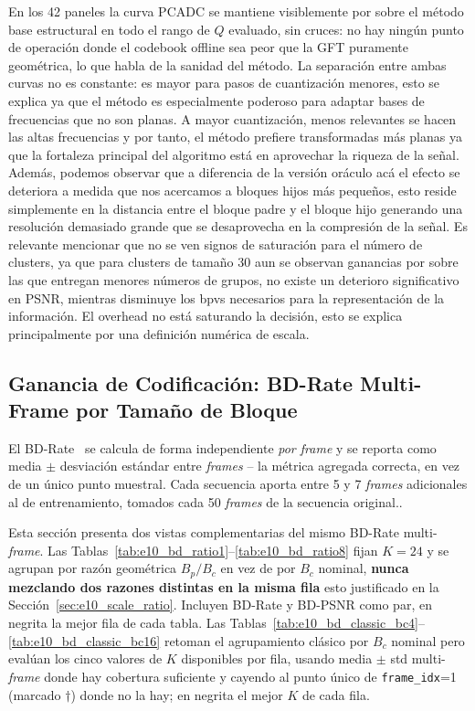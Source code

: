         En los 42 paneles la curva PCADC se mantiene visiblemente por sobre el método base
        estructural en todo el rango de $Q$ evaluado, sin cruces: no hay ningún punto de
        operación donde el codebook offline sea peor que la GFT puramente geométrica, lo que habla de la sanidad del método. La
        separación entre ambas curvas no es constante: es mayor para pasos de cuantización menores, esto se explica ya que el método es especialmente poderoso para adaptar bases de frecuencias que no son planas. A mayor cuantización, menos relevantes se hacen las altas frecuencias y por tanto, el método prefiere transformadas más planas ya que la fortaleza principal del algoritmo está en aprovechar la riqueza de la señal. Además, podemos observar que a diferencia de la versión oráculo acá el efecto se deteriora a medida que nos acercamos a bloques hijos más pequeños, esto reside simplemente en la distancia entre el bloque padre y el bloque hijo generando una resolución demasiado grande que se desaprovecha en la compresión de la señal.
	Es relevante mencionar que no se ven signos de saturación para el número de clusters, ya que para clusters de tamaño 30 aun se observan ganancias por sobre las que entregan menores números de grupos, no existe un deterioro significativo en PSNR, mientras disminuye los bpvs necesarios para la representación de la información. El overhead no está saturando la decisión, esto se explica principalmente por una definición numérica de escala.


    \subsection{Ganancia de Codificación: BD-Rate Multi-Frame por Tamaño de Bloque}
        \label{sec:e10_bd_summary}

        El BD-Rate~\cite{bjontegaard2001calculation} se calcula de forma independiente \emph{por frame} y se reporta como media
        $\pm$ desviación estándar entre \textit{frames} -- la métrica agregada correcta, en vez
        de un único punto muestral. Cada secuencia aporta entre 5 y 7 \textit{frames}
        adicionales al de entrenamiento, tomados cada 50 \textit{frames} de la secuencia
        original..

        Esta sección presenta dos vistas complementarias del mismo BD-Rate multi-\textit{frame}.
        Las Tablas~\ref{tab:e10_bd_ratio1}--\ref{tab:e10_bd_ratio8} fijan $K=24$ y se agrupan
        por razón geométrica $B_p/B_c$ en vez de por $B_c$ nominal, \textbf{nunca mezclando dos
        razones distintas en la misma fila} esto justificado en la Sección~\ref{sec:e10_scale_ratio}. Incluyen
        BD-Rate y BD-PSNR como par, en negrita la mejor fila de cada tabla. Las
        Tablas~\ref{tab:e10_bd_classic_bc4}--\ref{tab:e10_bd_classic_bc16} retoman el agrupamiento
        clásico por $B_c$ nominal pero evalúan los cinco valores de $K$ disponibles por fila,
        usando media $\pm$ std multi-\textit{frame} donde hay cobertura suficiente y cayendo al
        punto único de \texttt{frame\_idx}=1 (marcado $\dagger$) donde no la hay; en negrita el
        mejor $K$ de cada fila.

